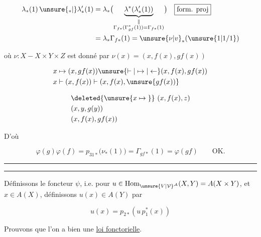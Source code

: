 \[
\begin{aligned}
\lambda_*(1)\,\unsure{{}_*|{}}\lambda'_*(1)&=\lambda_*\bigl(\underbrace{\lambda^*(\lambda'_*(1))}_{\substack{\Vert\\\Gamma_{f*}(\Gamma_{gf}^*(1))=\Gamma_{f*}(1)}}\bigr)\quad\boxed{\text{form. proj}}\\
&=\lambda_*\Gamma_{f*}(1)=\unsure{\nu|v}_*(\unsure{1|1/1})
\end{aligned}
\]

où $\nu:X\mathbin{-}X\times Y\times Z$ est donné par $\nu(x)=(x,f(x),gf(x))$

\[
\begin{aligned}
x&\mapsto (x,gf(x))\unsure{\vdash|\mapsto|\leftarrow} (x,f(x),gf(x))\\
x&\vdash (x,f(x))\vdash (x,f(x),\unsure{gf(x))}
\end{aligned}
\]

\[
\begin{aligned}
&\deleted{\unsure{x\mapsto{}}}\ (x,f(x),z)\\
&(x,y,g(y))\\
&(x,f(x),gf(x))
\end{aligned}
\]

D'où

\[
\varphi(g)\varphi(f)=p_{31*}\bigl(\nu_*(1)\bigr)=\Gamma_{gf*}(1)=\varphi(gf)\qquad\text{OK.}
\]

\noindent\rule{3.5cm}{0.3pt}\par\nobreak\vspace{-0.8\baselineskip}\noindent\rule{3.6cm}{0.3pt}

Définissons le foncteur $\psi$,  i.e. pour $u\in\operatorname{Hom}_{\unsure{V|\mathcal V}^{\mathcal A}}(X,Y)=A(X\times Y)$, et $x\in A(X)$, définissons $u(x)\in A(Y)$ par  

\[
u(x)=p_{2*}(u\,p_1^*(x))
\]

Prouvons que l'on a bien une \uline{loi fonctorielle}.

